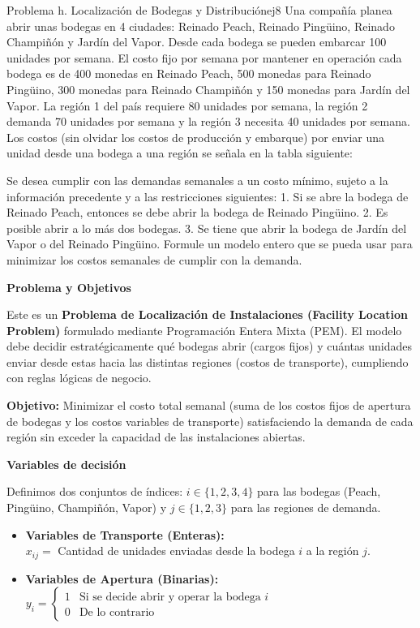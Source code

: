 \documentclass[10pt,a4paper]{article}
\begin{document}
\begin{ejercicio}{Problema h. Localización de Bodegas y Distribución}{ej8}
Una compañía planea abrir unas bodegas en 4 ciudades: Reinado Peach, Reinado Pingüino, Reinado Champiñón y Jardín del Vapor. Desde cada bodega se pueden embarcar 100 unidades por semana. El costo fijo por semana por mantener en operación cada bodega es de 400 monedas en Reinado Peach, 500 monedas para Reinado Pingüino, 300 monedas para Reinado Champiñón y 150 monedas para Jardín del Vapor. La región 1 del país requiere 80 unidades por semana, la región 2 demanda 70 unidades por semana y la región 3 necesita 40 unidades por semana. Los costos (sin olvidar los costos de producción y embarque) por enviar una unidad desde una bodega a una región se señala en la tabla siguiente:


Se desea cumplir con las demandas semanales a un costo mínimo, sujeto a la información precedente y a las restricciones siguientes:
1. Si se abre la bodega de Reinado Peach, entonces se debe abrir la bodega de Reinado Pingüino.
2. Es posible abrir a lo más dos bodegas.
3. Se tiene que abrir la bodega de Jardín del Vapor o del Reinado Pingüino.
Formule un modelo entero que se pueda usar para minimizar los costos semanales de cumplir con la demanda.
\end{ejercicio}

\vspace{3mm}
\textbf{Problema y Objetivos}

Este es un \textbf{Problema de Localización de Instalaciones (Facility Location Problem)} formulado mediante Programación Entera Mixta (PEM). El modelo debe decidir estratégicamente qué bodegas abrir (cargos fijos) y cuántas unidades enviar desde estas hacia las distintas regiones (costos de transporte), cumpliendo con reglas lógicas de negocio.

\textbf{Objetivo:} Minimizar el costo total semanal (suma de los costos fijos de apertura de bodegas y los costos variables de transporte) satisfaciendo la demanda de cada región sin exceder la capacidad de las instalaciones abiertas.

\vspace{3mm}
\textbf{Variables de decisión}

Definimos dos conjuntos de índices: $i \in \{1, 2, 3, 4\}$ para las bodegas (Peach, Pingüino, Champiñón, Vapor) y $j \in \{1, 2, 3\}$ para las regiones de demanda.
\begin{itemize}
    \item \textbf{Variables de Transporte (Enteras):} \\
    $x_{ij} = $ Cantidad de unidades enviadas desde la bodega $i$ a la región $j$.
    
    \item \textbf{Variables de Apertura (Binarias):} \\
    $y_i = 
    \begin{cases} 
    1 & \text{Si se decide abrir y operar la bodega } i \\
    0 & \text{De lo contrario}
    \end{cases}$
\end{itemize}
\end{document}
